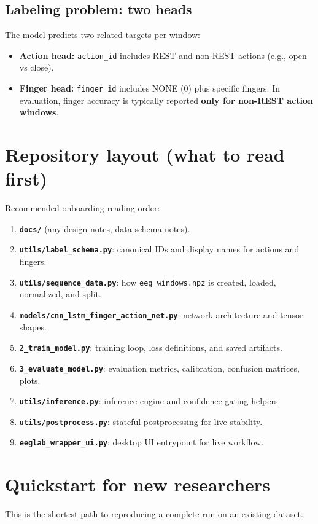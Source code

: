 \documentclass[11pt]{article}
\begin{document}
\subsection{Labeling problem: two heads}
The model predicts two related targets per window:
\begin{itemize}[leftmargin=*]
\item \textbf{Action head:} \texttt{action\_id} includes REST and non-REST actions (e.g., open vs close).
\item \textbf{Finger head:} \texttt{finger\_id} includes NONE (0) plus specific fingers. In evaluation, finger accuracy is typically reported \textbf{only for non-REST action windows}.
\end{itemize}

\section{Repository layout (what to read first)}
Recommended onboarding reading order:
\begin{enumerate}[leftmargin=*]
\item \textbf{\texttt{docs/}} (any design notes, data schema notes).
\item \textbf{\texttt{utils/label\_schema.py}}: canonical IDs and display names for actions and fingers.
\item \textbf{\texttt{utils/sequence\_data.py}}: how \texttt{eeg\_windows.npz} is created, loaded, normalized, and split.
\item \textbf{\texttt{models/cnn\_lstm\_finger\_action\_net.py}}: network architecture and tensor shapes.
\item \textbf{\texttt{2\_train\_model.py}}: training loop, loss definitions, and saved artifacts.
\item \textbf{\texttt{3\_evaluate\_model.py}}: evaluation metrics, calibration, confusion matrices, plots.
\item \textbf{\texttt{utils/inference.py}}: inference engine and confidence gating helpers.
\item \textbf{\texttt{utils/postprocess.py}}: stateful postprocessing for live stability.
\item \textbf{\texttt{eeglab\_wrapper\_ui.py}}: desktop UI entrypoint for live workflow.
\end{enumerate}

\section{Quickstart for new researchers}
This is the shortest path to reproducing a complete run on an existing dataset.
\end{document}
